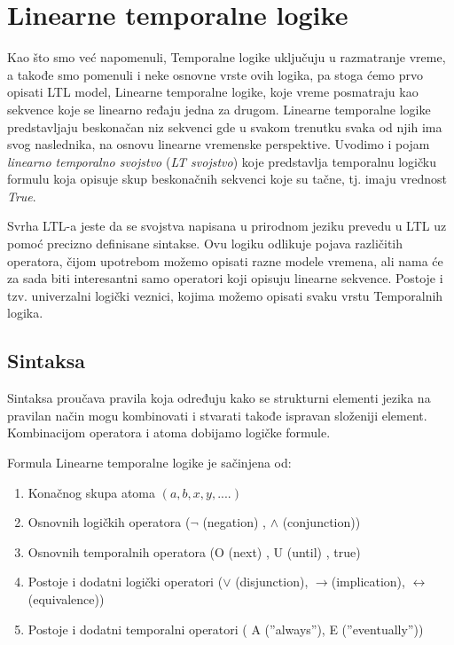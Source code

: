 \documentclass[a4paper]{article}
\begin{document}
{	\section{Linearne temporalne logike}
	\label{sec:LTL}

	Kao što smo već napomenuli, Temporalne logike uključuju u razmatranje vreme, a takođe smo pomenuli i neke osnovne vrste ovih logika, pa stoga ćemo prvo opisati LTL model, Linearne temporalne logike, koje vreme posmatraju kao sekvence koje se linearno ređaju jedna za drugom. Linearne temporalne logike predstavljaju beskonačan niz sekvenci gde u svakom trenutku svaka od njih ima svog naslednika, na osnovu linearne vremenske perspektive. Uvodimo i pojam \emph{linearno temporalno svojstvo} (\emph{LT svojstvo}) koje predstavlja temporalnu logičku formulu koja opisuje skup beskonačnih sekvenci koje su tačne, tj. imaju vrednost \emph{True}.\cite{reeves1990logic}\newline

	Svrha LTL-a jeste da se svojstva napisana u prirodnom jeziku prevedu u LTL uz pomoć precizno definisane sintakse. Ovu logiku odlikuje pojava različitih operatora, čijom upotrebom možemo opisati razne modele vremena, ali nama će za sada biti interesantni samo operatori koji opisuju linearne sekvence. Postoje i tzv. univerzalni logički veznici, kojima možemo opisati svaku vrstu  Temporalnih logika.\cite{reeves1990logic}
	\subsection{Sintaksa}
	\label{subsec:podnaslovN}
	
Sintaksa proučava pravila koja određuju kako se strukturni elementi jezika na pravilan način mogu kombinovati i stvarati takođe ispravan složeniji element. Kombinacijom operatora i atoma dobijamo logičke formule.\newline

Formula Linearne temporalne logike je sačinjena od: 
\begin{enumerate}
\item  Konačnog skupa atoma $(a, b, x, y, ....)$
\item  Osnovnih logičkih operatora ($\neg$  (negation) , $\wedge$ (conjunction)) 
\item  Osnovnih temporalnih operatora (O (next) , U (until) , true) 
\item  Postoje i dodatni logički operatori ($\vee$ (disjunction), $\rightarrow$(implication), $\leftrightarrow$(equivalence))
\item  Postoje i dodatni temporalni operatori ( A (”always”), E (”eventually”))
\end{enumerate}

}
\end{document}

